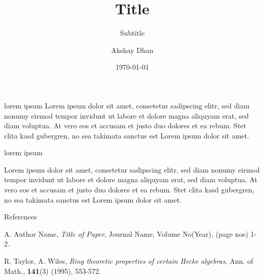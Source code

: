 \documentclass{beamer}
\author{Akshay Dhan}
\title{Title}
\subtitle{Subtitle}
\institute{Institute}
\date{\today}
\theoremstyle{definition}
\theoremstyle{remark}
\begin{document}
\frame{\titlepage}
\begin{frame}{lorem ipsum}
Lorem ipsum dolor sit amet, consetetur sadipscing elitr, sed diam nonumy eirmod
	tempor invidunt ut labore et dolore magna aliquyam erat, sed diam
	voluptua. At vero eos et accusam et justo duo dolores et ea rebum. Stet
	clita kasd gubergren, no sea takimata sanctus est Lorem ipsum dolor sit
	amet.
\end{frame}
\begin{frame}{lorem ipsum}
	\begin{thm}[lorem]
Lorem ipsum dolor sit amet, consetetur sadipscing elitr, sed diam nonumy
		eirmod tempor invidunt ut labore et dolore magna aliquyam
		erat, sed diam voluptua. At vero eos et accusam et justo
		duo dolores et ea rebum. Stet clita kasd gubergren, no sea
		takimata sanctus est Lorem ipsum dolor sit amet.
\end{thm}
\end{frame}

\begin{frame}[t]{References}\vspace{10pt}
\begin{thebibliography}{abcd}
A. Author Name, 
{\it Title of Paper}, Journal Name, Volume No(Year), (page nos) 1-2.

R. Taylor, A. Wiles, {\it Ring theoretic properties of certain Hecke algebras}, Ann. of Math., \textbf{141}(3) (1995), 553-572.

\end{thebibliography}
\end{frame}
\end{document}
